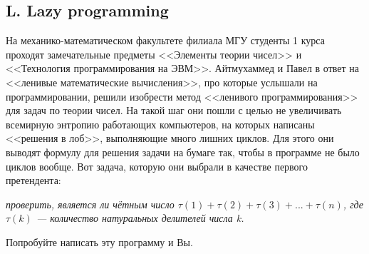 \subsection*{L. Lazy programming}

На механико-математическом факультете филиала МГУ студенты 1 курса проходят замечательные предметы <<Элементы теории чисел>> и <<Технология программирования на ЭВМ>>. Айтмухаммед и Павел в ответ на <<ленивые математические вычисления>>, про которые услышали на программировании, решили изобрести метод <<ленивого программирования>> для задач по теории чисел. На такой шаг они пошли с целью не увеличивать всемирную энтропию работающих компьютеров, на которых написаны <<решения в лоб>>, выполняющие много лишних циклов. Для этого они выводят формулу для решения задачи на бумаге так, чтобы в программе не было циклов вообще. Вот задача, которую они выбрали в качестве первого претендента:

\textit{проверить, является ли чётным число $\tau(1) + \tau(2) + \tau(3) + ... + \tau(n)$, \newline где $\tau(k)$ --- количество натуральных делителей числа k.}

Попробуйте написать эту программу и Вы. 




